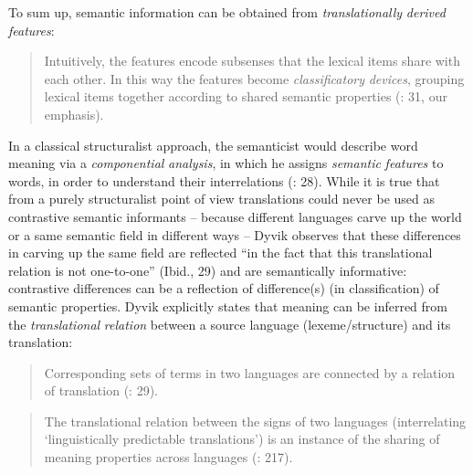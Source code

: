To sum up, semantic information can be obtained from \textit{translationally} \textit{derived} \textit{features}:


\begin{quote}
Intuitively, the features encode subsenses that the lexical items share with each other. In this way the features become \textit{classificatory} \textit{devices}, grouping lexical items together according to shared semantic properties (\citealt{langemets_translations_2005}: 31, our emphasis).
\end{quote}


In a classical structuralist approach, the semanticist would describe word meaning via a \textit{componential} \textit{analysis}, in which he assigns \textit{semantic} \textit{features} to words, in order to understand their interrelations (\citealt{langemets_translations_2005}: 28). While it is true that from a purely structuralist point of view translations could never be used as contrastive semantic informants – because different languages carve up the world or a same semantic field in different ways – Dyvik observes that these differences in carving up the same field are reflected “in the fact that this translational relation is not one-to-one” (Ibid., 29) and are semantically informative: contrastive differences can be a reflection of difference(s) (in classification) of semantic properties. Dyvik explicitly states that meaning can be inferred from the \textit{translational} \textit{relation} between a source language (lexeme/structure) and its translation:


\begin{quote}
Corresponding sets of terms in two languages are connected by a relation of translation (\citealt{langemets_translations_2005}: 29).
\end{quote}

\begin{quote}
The translational relation between the signs of two languages (interrelating ‘linguistically predictable translations’) is an instance of the sharing of meaning properties across languages (\citealt{hasselgard_complexity_1999}: 217).
\end{quote}


